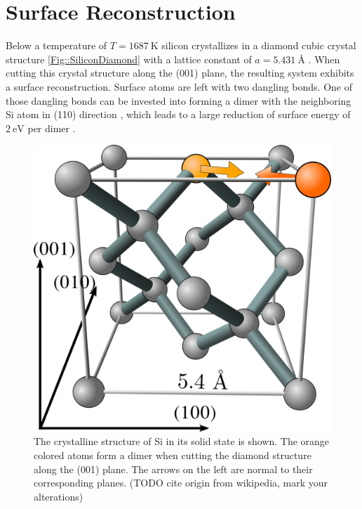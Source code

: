 	\section{Surface Reconstruction}
	Below a temperature of $T =	1687~\text{K}$ silicon crystallizes in a diamond cubic crystal structure \autoref{Fig::SiliconDiamond} with a lattice constant of $a =	5.431~\text{\AA} $ \cite{tiesinga2021codata}. When cutting this crystal structure along the (001) plane, the resulting system exhibits a surface reconstruction. Surface atoms are left with two dangling bonds. One of those dangling bonds can be invested into forming a dimer with the neighboring Si atom in (110) direction \cite{chadi1979atomic}, which leads to a large reduction of surface energy of $2~\text{eV}$ per dimer \cite{ramstad1995theoretical}.
	\begin{figure}[htp]
		\centering
		\includegraphics[width=0.7\linewidth]{graphics/Sili.png}
		\caption{The crystalline structure of Si in its solid state is shown. The orange colored atoms form a dimer when cutting the diamond structure along the (001) plane. The arrows on the left are normal to their corresponding planes. (TODO cite origin from wikipedia, mark your alterations)}
		\label{Fig::SiliconDiamond}
	\end{figure}
	
